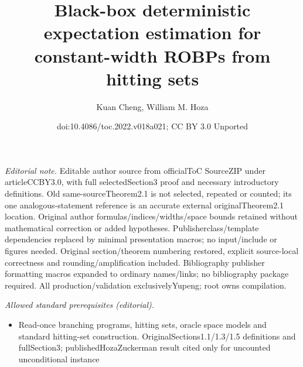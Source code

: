 \documentclass[10pt,a4paper]{article}
\title{Black-box deterministic expectation estimation for constant-width ROBPs from hitting sets}
\author{Kuan Cheng, William M. Hoza}
\date{doi:10.4086/toc.2022.v018a021; CC BY 3.0 Unported}
\begin{document}
\maketitle
\noindent\textit{Editorial note.} Editable author source from officialToC SourceZIP under articleCCBY3.0, with full selectedSection3 proof and necessary introductory definitions. Old same-sourceTheorem2.1 is not selected, repeated or counted; its one analogous-statement reference is an accurate external originalTheorem2.1 location. Original author formulas/indices/widths/space bounds retained without mathematical correction or added hypotheses. Publisherclass/template dependencies replaced by minimal presentation macros; no input/include or figures needed. Original section/theorem numbering restored, explicit source-local correctness and rounding/amplification included. Bibliography publisher formatting macros expanded to ordinary names/links; no bibliography package required. All production/validation exclusivelyYupeng; root owns compilation.\par\medskip
\noindent\textit{Allowed standard prerequisites (editorial).}\begin{itemize}
\item Read-once branching programs, hitting sets, oracle space models and standard hitting-set construction. OriginalSections1.1/1.3/1.5 definitions and fullSection3; publishedHozaZuckerman result cited only for uncounted unconditional instance
\end{itemize}\medskip
\setcounter{section}{1}
\end{document}
